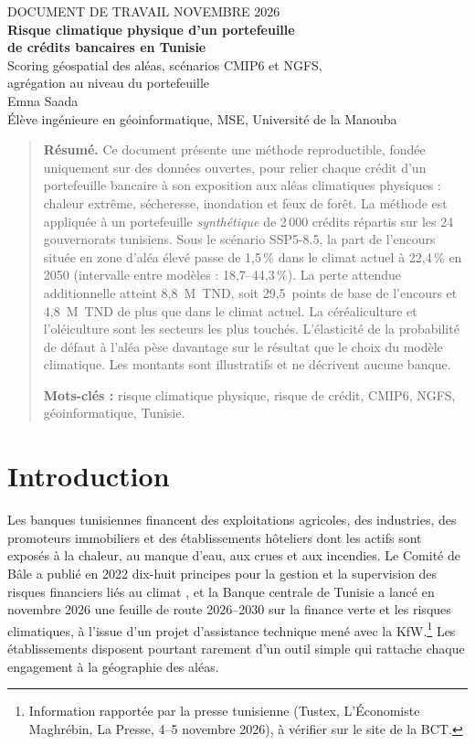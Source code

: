 \documentclass[11pt,a4paper]{article}
\begin{document}
\thispagestyle{plain}
\begin{center}
{\small DOCUMENT DE TRAVAIL \quad\textperiodcentered\quad NOVEMBRE 2026}\\[1.6em]
{\LARGE\bfseries Risque climatique physique d'un portefeuille\\[0.25em] de crédits bancaires en Tunisie}\\[0.8em]
{\large Scoring géospatial des aléas, scénarios CMIP6 et NGFS,\\ agrégation au niveau du portefeuille}\\[1.4em]
{\large Emna Saada}\\[0.2em]
{\small Élève ingénieure en géoinformatique, MSE, Université de la Manouba}
\end{center}
\vspace{1.2em}

\begin{quote}
\small
\noindent\textbf{Résumé.} Ce document présente une méthode reproductible, fondée uniquement sur des données ouvertes, pour relier chaque crédit d'un portefeuille bancaire à son exposition aux aléas climatiques physiques : chaleur extrême, sécheresse, inondation et feux de forêt. La méthode est appliquée à un portefeuille \emph{synthétique} de 2\,000 crédits répartis sur les 24 gouvernorats tunisiens. Sous le scénario SSP5-8.5, la part de l'encours située en zone d'aléa élevé passe de 1{,}5\,\% dans le climat actuel à 22{,}4\,\% en 2050 (intervalle entre modèles : 18{,}7--44{,}3\,\%). La perte attendue additionnelle atteint 8{,}8~M~TND, soit 29{,}5~points de base de l'encours et 4{,}8~M~TND de plus que dans le climat actuel. La céréaliculture et l'oléiculture sont les secteurs les plus touchés. L'élasticité de la probabilité de défaut à l'aléa pèse davantage sur le résultat que le choix du modèle climatique. Les montants sont illustratifs et ne décrivent aucune banque.

\medskip
\noindent\textbf{Mots-clés :} risque climatique physique, risque de crédit, CMIP6, NGFS, géoinformatique, Tunisie.
\end{quote}
\vspace{0.6em}

\section{Introduction}

Les banques tunisiennes financent des exploitations agricoles, des industries, des promoteurs immobiliers et des établissements hôteliers dont les actifs sont exposés à la chaleur, au manque d'eau, aux crues et aux incendies. Le Comité de Bâle a publié en 2022 dix-huit principes pour la gestion et la supervision des risques financiers liés au climat \citep{bcbs2022}, et la Banque centrale de Tunisie a lancé en novembre 2026 une feuille de route 2026--2030 sur la finance verte et les risques climatiques, à l'issue d'un projet d'assistance technique mené avec la KfW.\footnote{Information rapportée par la presse tunisienne (Tustex, L'Économiste Maghrébin, La Presse, 4--5 novembre 2026), à vérifier sur le site de la BCT.} Les établissements disposent pourtant rarement d'un outil simple qui rattache chaque engagement à la géographie des aléas.
\end{document}
